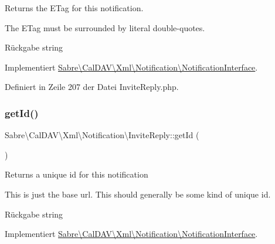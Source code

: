 Returns the E\+Tag for this notification.

The E\+Tag must be surrounded by literal double-\/quotes.

\begin{DoxyReturn}{Rückgabe}
string 
\end{DoxyReturn}


Implementiert \mbox{\hyperlink{interface_sabre_1_1_cal_d_a_v_1_1_xml_1_1_notification_1_1_notification_interface_a5f87e03e47df0de258d637209fc906be}{Sabre\textbackslash{}\+Cal\+D\+A\+V\textbackslash{}\+Xml\textbackslash{}\+Notification\textbackslash{}\+Notification\+Interface}}.



Definiert in Zeile 207 der Datei Invite\+Reply.\+php.

\mbox{\label{class_sabre_1_1_cal_d_a_v_1_1_xml_1_1_notification_1_1_invite_reply_ac89488dcca33c99be046dae7bd85de53}} 
\subsubsection{\texorpdfstring{get\+Id()}{getId()}}
{\footnotesize\ttfamily Sabre\textbackslash{}\+Cal\+D\+A\+V\textbackslash{}\+Xml\textbackslash{}\+Notification\textbackslash{}\+Invite\+Reply\+::get\+Id (\begin{DoxyParamCaption}{ }\end{DoxyParamCaption})}

Returns a unique id for this notification

This is just the base url. This should generally be some kind of unique id.

\begin{DoxyReturn}{Rückgabe}
string 
\end{DoxyReturn}


Implementiert \mbox{\hyperlink{interface_sabre_1_1_cal_d_a_v_1_1_xml_1_1_notification_1_1_notification_interface_a5fada5863f3ce0575c92bf56d4c76fdc}{Sabre\textbackslash{}\+Cal\+D\+A\+V\textbackslash{}\+Xml\textbackslash{}\+Notification\textbackslash{}\+Notification\+Interface}}.



